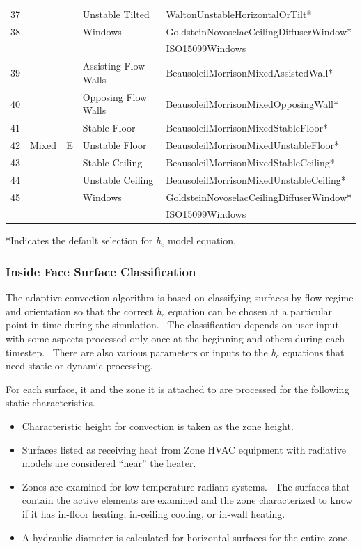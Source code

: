 \begin{longtable}[c]{p{0.25in}p{1.25in}p{0.25in}p{1.5in}p{2.75in}}
37 & & & Unstable Tilted & WaltonUnstableHorizontalOrTilt* \tabularnewline
38 & & & Windows & GoldsteinNovoselacCeilingDiffuserWindow* \tabularnewline
 & & & & ISO15099Windows \tabularnewline
\midrule
39 & & & Assisting Flow Walls & BeausoleilMorrisonMixedAssistedWall* \tabularnewline
40 & & & Opposing Flow Walls & BeausoleilMorrisonMixedOpposingWall* \tabularnewline
41 & & & Stable Floor & BeausoleilMorrisonMixedStableFloor* \tabularnewline
42 & Mixed & E & Unstable Floor & BeausoleilMorrisonMixedUnstableFloor* \tabularnewline
43 & & & Stable Ceiling & BeausoleilMorrisonMixedStableCeiling* \tabularnewline
44 & & & Unstable Ceiling & BeausoleilMorrisonMixedUnstableCeiling* \tabularnewline
45 & & & Windows & GoldsteinNovoselacCeilingDiffuserWindow* \tabularnewline
 & & & & ISO15099Windows \tabularnewline
\bottomrule
\end{longtable}

*Indicates the default selection for \emph{h\(_{c}\)} model equation.

\subsubsection{Inside Face Surface Classification}\label{inside-face-surface-classification}

The adaptive convection algorithm is based on classifying surfaces by flow regime and orientation so that the correct \emph{h\(_{c}\)} equation can be chosen at a particular point in time during the simulation.~ The classification depends on user input with some aspects processed only once at the beginning and others during each timestep.~ There are also various parameters or inputs to the \emph{h\(_{c}\)} equations that need static or dynamic processing.

For each surface, it and the zone it is attached to are processed for the following static characteristics.

\begin{itemize}
\item
  Characteristic height for convection is taken as the zone height.
\item
  Surfaces listed as receiving heat from Zone HVAC equipment with radiative models are considered ``near'' the heater.
\item
  Zones are examined for low temperature radiant systems.~ The surfaces that contain the active elements are examined and the zone characterized to know if it has in-floor heating, in-ceiling cooling, or in-wall heating.
\item
  A hydraulic diameter is calculated for horizontal surfaces for the entire zone.
\end{itemize}


